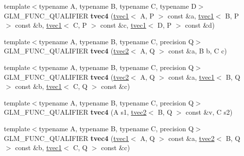 \begin{DoxyCompactItemize}
\item 
\hypertarget{structglm_1_1tvec4_adecd3cfc25453457804863d43c23699b}{{\footnotesize template$<$typename A, typename B, typename C, typename D$>$ }\\G\-L\-M\-\_\-\-F\-U\-N\-C\-\_\-\-Q\-U\-A\-L\-I\-F\-I\-E\-R {\bfseries tvec4} (\hyperlink{structglm_1_1tvec1}{tvec1}$<$ A, P $>$ const \&a, \hyperlink{structglm_1_1tvec1}{tvec1}$<$ B, P $>$ const \&b, \hyperlink{structglm_1_1tvec1}{tvec1}$<$ C, P $>$ const \&c, \hyperlink{structglm_1_1tvec1}{tvec1}$<$ D, P $>$ const \&d)}\label{structglm_1_1tvec4_adecd3cfc25453457804863d43c23699b}

\item 
\hypertarget{structglm_1_1tvec4_aac267fee7cdcdc91bf76d85c36dc040a}{{\footnotesize template$<$typename A, typename B, typename C, precision Q$>$ }\\G\-L\-M\-\_\-\-F\-U\-N\-C\-\_\-\-Q\-U\-A\-L\-I\-F\-I\-E\-R {\bfseries tvec4} (\hyperlink{structglm_1_1tvec2}{tvec2}$<$ A, Q $>$ const \&a, B b, C c)}\label{structglm_1_1tvec4_aac267fee7cdcdc91bf76d85c36dc040a}

\item 
\hypertarget{structglm_1_1tvec4_a2dd8cf221e3065d780137a4887a431d0}{{\footnotesize template$<$typename A, typename B, typename C, precision Q$>$ }\\G\-L\-M\-\_\-\-F\-U\-N\-C\-\_\-\-Q\-U\-A\-L\-I\-F\-I\-E\-R {\bfseries tvec4} (\hyperlink{structglm_1_1tvec2}{tvec2}$<$ A, Q $>$ const \&a, \hyperlink{structglm_1_1tvec1}{tvec1}$<$ B, Q $>$ const \&b, \hyperlink{structglm_1_1tvec1}{tvec1}$<$ C, Q $>$ const \&c)}\label{structglm_1_1tvec4_a2dd8cf221e3065d780137a4887a431d0}

\item 
\hypertarget{structglm_1_1tvec4_a37aac830c1d15a4931d665f2cb287097}{{\footnotesize template$<$typename A, typename B, typename C, precision Q$>$ }\\G\-L\-M\-\_\-\-F\-U\-N\-C\-\_\-\-Q\-U\-A\-L\-I\-F\-I\-E\-R {\bfseries tvec4} (A s1, \hyperlink{structglm_1_1tvec2}{tvec2}$<$ B, Q $>$ const \&v, C s2)}\label{structglm_1_1tvec4_a37aac830c1d15a4931d665f2cb287097}

\item 
\hypertarget{structglm_1_1tvec4_ac66703916afebb1a35d0c8d354952ff9}{{\footnotesize template$<$typename A, typename B, typename C, precision Q$>$ }\\G\-L\-M\-\_\-\-F\-U\-N\-C\-\_\-\-Q\-U\-A\-L\-I\-F\-I\-E\-R {\bfseries tvec4} (\hyperlink{structglm_1_1tvec1}{tvec1}$<$ A, Q $>$ const \&a, \hyperlink{structglm_1_1tvec2}{tvec2}$<$ B, Q $>$ const \&b, \hyperlink{structglm_1_1tvec1}{tvec1}$<$ C, Q $>$ const \&c)}\label{structglm_1_1tvec4_ac66703916afebb1a35d0c8d354952ff9}


\end{DoxyCompactItemize}
